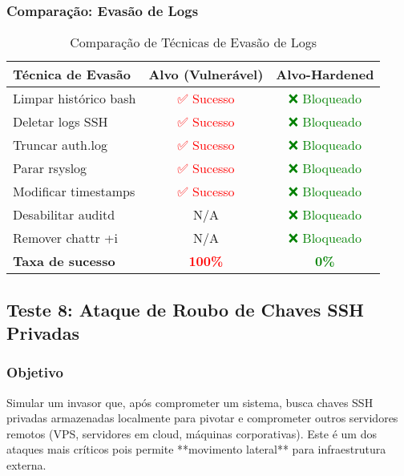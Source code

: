 \documentclass[12pt]{article}
\begin{document}
\subsubsection{Comparação: Evasão de Logs}

\begin{table}[h]
\centering
\begin{tabular}{|l|c|c|}
\hline
\textbf{Técnica de Evasão} & \textbf{Alvo (Vulnerável)} & \textbf{Alvo-Hardened} \\ \hline
Limpar histórico bash & \textcolor{red}{✅ Sucesso} & \textcolor{green}{❌ Bloqueado} \\ \hline
Deletar logs SSH & \textcolor{red}{✅ Sucesso} & \textcolor{green}{❌ Bloqueado} \\ \hline
Truncar auth.log & \textcolor{red}{✅ Sucesso} & \textcolor{green}{❌ Bloqueado} \\ \hline
Parar rsyslog & \textcolor{red}{✅ Sucesso} & \textcolor{green}{❌ Bloqueado} \\ \hline
Modificar timestamps & \textcolor{red}{✅ Sucesso} & \textcolor{green}{❌ Bloqueado} \\ \hline
Desabilitar auditd & N/A & \textcolor{green}{❌ Bloqueado} \\ \hline
Remover chattr +i & N/A & \textcolor{green}{❌ Bloqueado} \\ \hline
\textbf{Taxa de sucesso} & \textbf{\textcolor{red}{100\%}} & \textbf{\textcolor{green}{0\%}} \\ \hline
\end{tabular}
\caption{Comparação de Técnicas de Evasão de Logs}
\end{table}

\subsection{Teste 8: Ataque de Roubo de Chaves SSH Privadas}

\subsubsection{Objetivo}
Simular um invasor que, após comprometer um sistema, busca chaves SSH privadas armazenadas localmente para pivotar e comprometer outros servidores remotos (VPS, servidores em cloud, máquinas corporativas). Este é um dos ataques mais críticos pois permite **movimento lateral** para infraestrutura externa.
\end{document}
